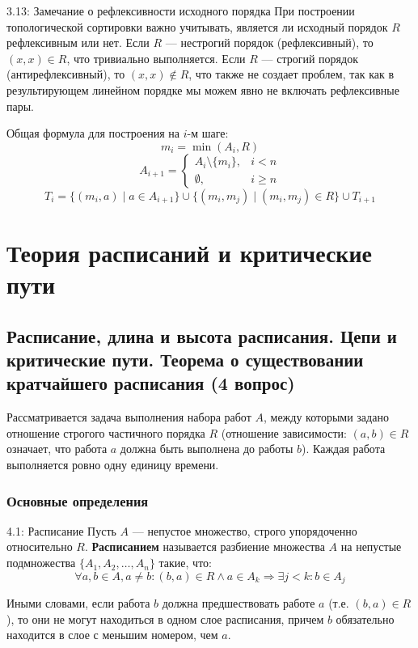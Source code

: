 \documentclass[a4paper,12pt]{article}
\begin{document}
	\begin{notebook}{3.13: Замечание о рефлексивности исходного порядка}
		При построении топологической сортировки важно учитывать, является ли исходный порядок $R$ рефлексивным или нет. Если $R$ — нестрогий порядок (рефлексивный), то $(x,x) \in R$, что тривиально выполняется. Если $R$ — строгий порядок (антирефлексивный), то $(x,x) \notin R$, что также не создает проблем, так как в результирующем линейном порядке мы можем явно не включать рефлексивные пары.
		
		Общая формула для построения на $i$-м шаге:
		\[ m_i = \min(A_i, R) \]
		\[ A_{i+1} = \begin{cases} 
			A_i \setminus \{m_i\}, & i < n \\ 
			\emptyset, & i \ge n 
		\end{cases} \]
		\[ T_i = \{(m_i, a) \mid a \in A_{i+1}\} \cup \{(m_i, m_j) \mid (m_i, m_j) \in R\} \cup T_{i+1} \]
	\end{notebook}
	
	
	
	
	
	
	
	
	
	
	\newpage
	\section{Теория расписаний и критические пути}
	
	\subsection{Расписание, длина и высота расписания. Цепи и критические пути. Теорема о существовании кратчайшего расписания (4 вопрос)}
	
	Рассматривается задача выполнения набора работ $A$, между которыми задано отношение строгого частичного порядка $R$ (отношение зависимости: $(a,b) \in R$ означает, что работа $a$ должна быть выполнена до работы $b$). Каждая работа выполняется ровно одну единицу времени.
	
	\subsubsection{Основные определения}
	
	\begin{definitionbox}{4.1: Расписание}
		Пусть $A$ — непустое множество, строго упорядоченно относительно $R$. 
		\textbf{Расписанием} называется разбиение множества $A$ на непустые подмножества 
		$\{A_1, A_2, \dots, A_n\}$ такие, что:
		\[ \forall a,b \in A, a \neq b: (b,a) \in R \land a \in A_k \Rightarrow \exists j < k: b \in A_j \]
		
		Иными словами, если работа $b$ должна предшествовать работе $a$ (т.е. $(b,a) \in R$), 
		то они не могут находиться в одном слое расписания, причем $b$ обязательно находится 
		в слое с меньшим номером, чем $a$.
	\end{definitionbox}
	
\end{document}
